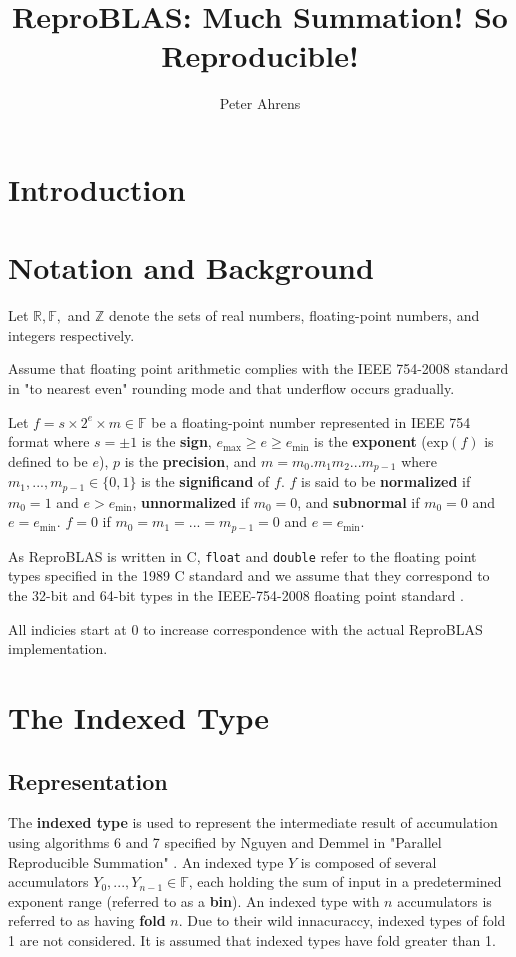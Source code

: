 \documentclass[12pt]{article}
\author{Peter Ahrens}
\title{ReproBLAS: Much Summation! So Reproducible!}
\providecommand{\R}{\ensuremath{\mathbb{R}}}
\providecommand{\F}{\ensuremath{\mathbb{F}}}
\providecommand{\Z}{\ensuremath{\mathbb{Z}}}
\providecommand{\exp}{\ensuremath{\text{exp}}}
\providecommand{\min}{\ensuremath{\text{min}}}
\providecommand{\max}{\ensuremath{\text{max}}}
\theoremstyle{plain}
\begin{document}
\noindent
\maketitle
\newpage
\section{Introduction}

\section{Notation and Background}
  Let $\R, \F, $ and $\Z$ denote the sets of real numbers, floating-point numbers, and integers respectively.

  Assume that floating point arithmetic complies with the IEEE 754-2008 standard in "to nearest even" rounding mode and that underflow occurs gradually.

  Let $f = s \times 2^e \times m \in \F$ be a floating-point number represented in IEEE 754 format where $s = \pm 1$ is the \textbf{sign}, $e_{\max} \geq e \geq e_{\min}$ is the \textbf{exponent} ($\exp(f)$ is defined to be $e$), $p$ is the \textbf{precision}, and $m = m_0.m_1m_2...m_{p-1}$ where $m_1, ..., m_{p - 1} \in \{0, 1\}$ is the \textbf{significand} of $f$. $f$ is said to be \textbf{normalized} if $m_0 = 1$ and $e > e_{\min}$, \textbf{unnormalized} if $m_0 = 0$, and \textbf{subnormal} if $m_0 = 0$ and $e = e_{\min}$. $f = 0$ if $m_0 = m_1 = ... = m_{p - 1} = 0$ and $e = e_{\min}$.

  As ReproBLAS is written in C, \verb|float| and \verb|double| refer to the floating point types specified in the 1989 C standard \cite{c89} and we assume that they correspond to the 32-bit and 64-bit types in the IEEE-754-2008 floating point standard \cite{ieee754}. 

  All indicies start at 0 to increase correspondence with the actual ReproBLAS implementation.

\section{The Indexed Type}
  \subsection{Representation}
    The \textbf{indexed type} is used to represent the intermediate result of accumulation using algorithms 6 and 7 specified by Nguyen and Demmel in "Parallel Reproducible Summation" \cite{repsum}.
    An indexed type $Y$ is composed of several accumulators $Y_0, ..., Y_{n - 1} \in \F$, each holding the sum of input in a predetermined exponent range (referred to as a \textbf{bin}). An indexed type with $n$ accumulators is referred to as having \textbf{fold} $n$. Due to their wild innacuraccy, indexed types of fold 1 are not considered. It is assumed that indexed types have fold greater than 1.
\end{document}
